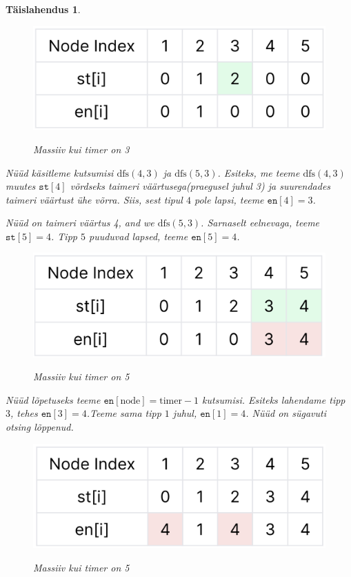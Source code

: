 \documentclass{trkut}
\newtheorem*{solution}{Täislahendus}
\begin{document}
\begin{solution}
\begin{figure}[H]%
    \includegraphics[width=12cm]{fourth.jpeg}%
    \caption{Massiiv kui timer on 3}%
    \label{joonis}%
\end{figure}

Nüüd käsitleme kutsumisi $\text{dfs}(4, 3)$ ja $\text{dfs}(5, 3)$. 
Esiteks, me teeme $\text{dfs}(4, 3)$ muutes $\texttt{st}[4]$ võrdseks taimeri väärtusega(praegusel juhul 3) ja suurendades taimeri väärtust ühe võrra. 
Siis, sest tipul $4$ pole lapsi, teeme $\texttt{en}[4]=3$.

Nüüd on taimeri väärtus 4, and we $\text{dfs}(5, 3)$. Sarnaselt eelnevaga, teeme $\texttt{st}[5]=4$. 
Tipp $5$ puuduvad lapsed,
teeme $\texttt{en}[5]=4$.


\begin{figure}[H]%
    \includegraphics[width=12cm]{fifth.jpeg}%
    \caption{Massiiv kui timer on 5}%
    \label{joonis}%
\end{figure}
Nüüd lõpetuseks teeme $\texttt{en}[\text{node}] = \text{timer} - 1$
kutsumisi. Esiteks lahendame tipp $3$, tehes $\texttt{en}[3]=4$.Teeme sama tipp $1$ juhul, $\texttt{en}[1]=4$. 
Nüüd on sügavuti otsing lõppenud.
\begin{figure}[H]%
    \includegraphics[width=12cm]{sixth.jpeg}%
    \caption{Massiiv kui timer on 5}%
    \label{joonis}%
\end{figure}
\end{solution}
\end{document}

